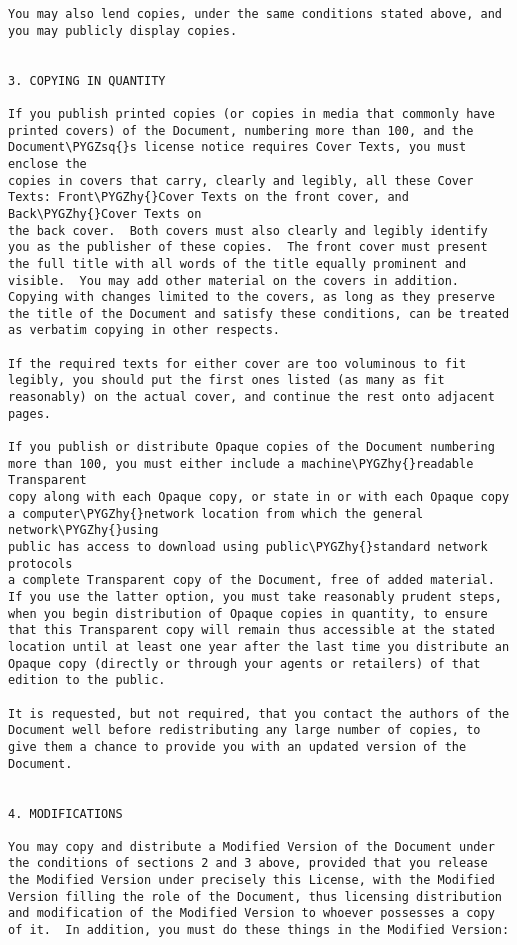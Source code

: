 \documentclass[letterpaper,10pt,english]{sphinxmanual}
\def\PYGZhy{\char`\-}
\def\PYGZsq{\char`\'}
\renewcommand\PYGZsq{\textquotesingle}
\begin{document}
\begin{Verbatim}[frame=single,commandchars=\\\{\}]
You may also lend copies, under the same conditions stated above, and
you may publicly display copies.


3. COPYING IN QUANTITY

If you publish printed copies (or copies in media that commonly have
printed covers) of the Document, numbering more than 100, and the
Document\PYGZsq{}s license notice requires Cover Texts, you must enclose the
copies in covers that carry, clearly and legibly, all these Cover
Texts: Front\PYGZhy{}Cover Texts on the front cover, and Back\PYGZhy{}Cover Texts on
the back cover.  Both covers must also clearly and legibly identify
you as the publisher of these copies.  The front cover must present
the full title with all words of the title equally prominent and
visible.  You may add other material on the covers in addition.
Copying with changes limited to the covers, as long as they preserve
the title of the Document and satisfy these conditions, can be treated
as verbatim copying in other respects.

If the required texts for either cover are too voluminous to fit
legibly, you should put the first ones listed (as many as fit
reasonably) on the actual cover, and continue the rest onto adjacent
pages.

If you publish or distribute Opaque copies of the Document numbering
more than 100, you must either include a machine\PYGZhy{}readable Transparent
copy along with each Opaque copy, or state in or with each Opaque copy
a computer\PYGZhy{}network location from which the general network\PYGZhy{}using
public has access to download using public\PYGZhy{}standard network protocols
a complete Transparent copy of the Document, free of added material.
If you use the latter option, you must take reasonably prudent steps,
when you begin distribution of Opaque copies in quantity, to ensure
that this Transparent copy will remain thus accessible at the stated
location until at least one year after the last time you distribute an
Opaque copy (directly or through your agents or retailers) of that
edition to the public.

It is requested, but not required, that you contact the authors of the
Document well before redistributing any large number of copies, to
give them a chance to provide you with an updated version of the
Document.


4. MODIFICATIONS

You may copy and distribute a Modified Version of the Document under
the conditions of sections 2 and 3 above, provided that you release
the Modified Version under precisely this License, with the Modified
Version filling the role of the Document, thus licensing distribution
and modification of the Modified Version to whoever possesses a copy
of it.  In addition, you must do these things in the Modified Version:


\end{Verbatim}
\end{document}
